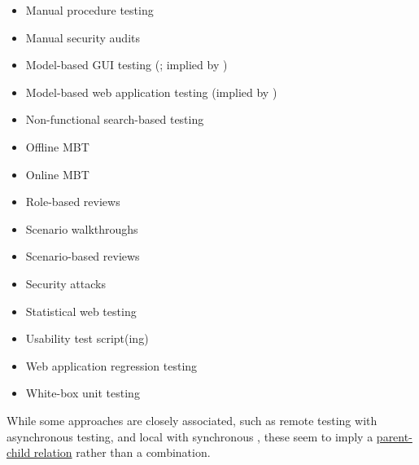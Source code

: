 \begin{itemize}
        \item Manual procedure testing \citep[p.~47]{Firesmith2015}
        \item Manual security audits \citep[p.~28]{Gerrard2000b}
        \item Model-based GUI testing (\citealp[Tab.~1]{DoğanEtAl2014}; implied
              by \citealp[p.~356]{SakamotoEtAl2013})
        \item Model-based web application testing (implied by
              \citealp[p.~356]{SakamotoEtAl2013})
        \item Non-functional search-based testing \citep[Tab.~1]{DoğanEtAl2014}
        \item Offline MBT \citepISTQB{}
        \item Online MBT \citepISTQB{}
        \item Role-based reviews \citepISTQB{}
        \item Scenario walkthroughs \citep[Fig.~4]{Gerrard2000a}
        \item Scenario-based reviews \citepISTQB{}
        \item Security attacks \citepISTQB{}
        \item Statistical web testing \citep[p.~185]{DoğanEtAl2014}
        \item Usability test script(ing) \citepISTQB{}
        \item Web application regression testing \cite[Tab.~21]{DoğanEtAl2014}
        \item White-box unit testing \citep[pp.~345-346]{SakamotoEtAl2013}
    \end{itemize}

    While some approaches are closely associated, such as remote testing
    with asynchronous testing, and local with synchronous \citep{JardEtAl1999},
    these seem to imply a \hyperref[par-chd-rels]{parent-child relation}
    rather than a combination.

\fi